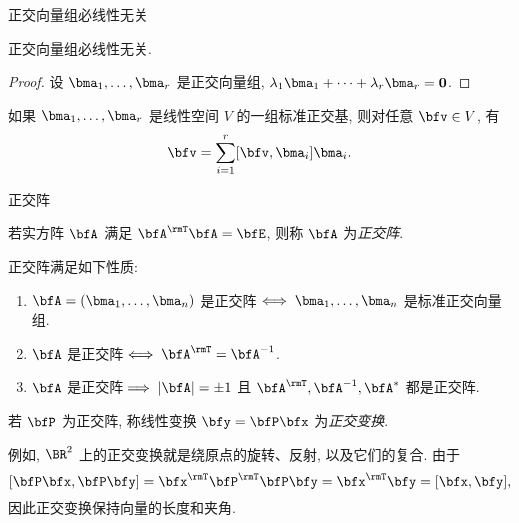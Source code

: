 \begin{frame}{正交向量组必线性无关}
	\onslide<+->
	\begin{theorem}
		正交向量组必线性无关.
	\end{theorem}
	\onslide<+->
	\begin{proof}
		设 $\bma_1,\dots,\bma_r$ 是正交向量组,
		$\lambda_1\bma_1+\cdots+\lambda_r\bma_r={\bf0}$.
		\onslide<+->{%
			故 $\bma_1,\dots,\bma_r$ 线性无关.\qedhere
		}
	\end{proof}
	\onslide<+->
	如果 $\bma_1,\dots,\bma_r$ 是线性空间 $V$ 的一组标准正交基, 则对任意 $\bfv\in V$, 有
	\[\bfv=\sum_{i=1}^r [\bfv,\bma_i]\bma_i.\]
\end{frame}


\begin{frame}{正交阵}
	\onslide<+->
	\begin{definition}
		若实方阵 $\bfA$ 满足 $\bfA^\rmT\bfA=\bfE$, 则称 $\bfA$ 为\emph{正交阵}.
	\end{definition}
	\onslide<+->
	正交阵满足如下性质:
	\begin{enumerate}\bf
		\item $\bfA=(\bma_1,\dots,\bma_n)$ 是正交阵$\iff \bma_1,\dots,\bma_n$ 是标准正交向量组.
		\item $\bfA$ 是正交阵$\iff\bfA^\rmT=\bfA^{-1}$.
		\item $\bfA$ 是正交阵$\implies|\bfA|=\pm1$ 且 $\bfA^\rmT,\bfA^{-1},\bfA^*$ 都是正交阵.
	\end{enumerate}
	\onslide<+->
	\begin{definition}
		若 $\bfP$ 为正交阵, 称线性变换 $\bfy=\bfP\bfx$ 为\emph{正交变换}.
	\end{definition}
	\onslide<+->
	例如, $\BR^2$ 上的正交变换就是绕原点的旋转、反射, 以及它们的复合.
	\onslide<+->
	由于
	\[[\bfP\bfx,\bfP\bfy]=\bfx^\rmT\bfP^\rmT\bfP\bfy=\bfx^\rmT\bfy=[\bfx,\bfy],\]
	因此\alert{正交变换保持向量的长度和夹角}.
\end{frame}



